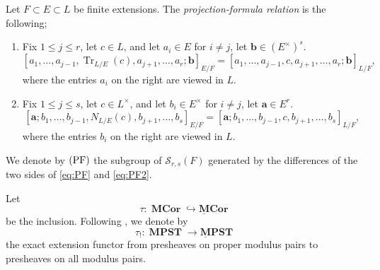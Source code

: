 \documentclass[a4paper,12pt,reqno]{amsart}
\numberwithin{equation}{section}
\theoremstyle{definition}
\DeclareMathOperator{\Tr}{Tr}
\newcommand{\MPST}{\operatorname{\mathbf{MPST}}}
\newcommand{\ulMPST}{\operatorname{\mathbf{{\underline{M}}PST}}}
\newcommand{\MCor}{\operatorname{\mathbf{MCor}}}
\newcommand{\ulMCor}{\operatorname{\mathbf{{\underline{M}}Cor}}}
\newcommand{\GaSharp}{\mathbb{G}_{a}^{\#}}
\newcommand{\va}{\mathbf{a}}
\newcommand{\vb}{\mathbf{b}}
\begin{document}
Let $F\subset E\subset L$ be finite extensions.
The
\emph{projection-formula relation} is the following;
\begin{enumerate}
    \item Fix $1\leq j\leq r$,
    let $c\in L$, and let $a_i\in E$ for $i\neq j$, let $\vb\in (E^\times)^s$.
    \begin{equation}\label{eq:PF}
    [a_1,\ldots,a_{j-1},\Tr_{L/E}(c),a_{j+1},\ldots,a_r;\vb]_{E/F} =
    [a_1,\ldots,a_{j-1},c,a_{j+1},\ldots,a_r;\vb]_{L/F},
    \end{equation}
    where the entries $a_i$ on the right are viewed in $L$.  
    
    \item 
    Fix $1\leq j\leq s$,
    let $c\in L^\times$, and let $b_i\in E^\times$ for $i\neq j$, let $\va\in E^r$.  
    \begin{equation}\label{eq:PF2}
    [\va;b_1,\ldots,b_{j-1},N_{L/E}(c),b_{j+1},\ldots,b_s]_{E/F} =
    [\va;b_1,\ldots,b_{j-1},c,b_{j+1},\ldots,b_s]_{L/F},
    \end{equation}
    where the entries $b_i$ on the right are viewed in $L$. 
\end{enumerate}
We denote by $\textnormal{(PF)}$ the subgroup of $\mathcal S_{r,s}(F)$
generated by the differences of the two sides of \eqref{eq:PF} and \eqref{eq:PF2}.  



Let
\[
 \tau:\MCor\hookrightarrow \ulMCor
\]
be the inclusion.  Following \cite[Equation~(3.5.1)]{RSY22}, we denote by
\[
 \tau_!:\MPST\to\ulMPST
\]
the exact extension functor from presheaves on proper modulus pairs to
presheaves on all modulus pairs. 
\end{document}
